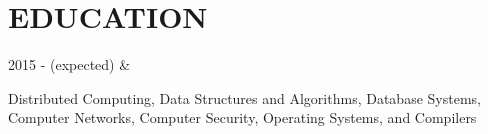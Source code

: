 \documentclass[]{richard-dang}
\begin{document}
\section*{\faMortarBoard \hspace{\FAspace} EDUCATION}
\begin{tabularcv}
    2015 -  (expected)   &   
                    \begin{tabitemize}
                        \item Distributed Computing, Data Structures and Algorithms, Database Systems, Computer Networks, Computer Security, Operating Systems, and Compilers 
                    \end{tabitemize} 
                    \\[\vspacepar] 
\end{tabularcv}
\end{document}
